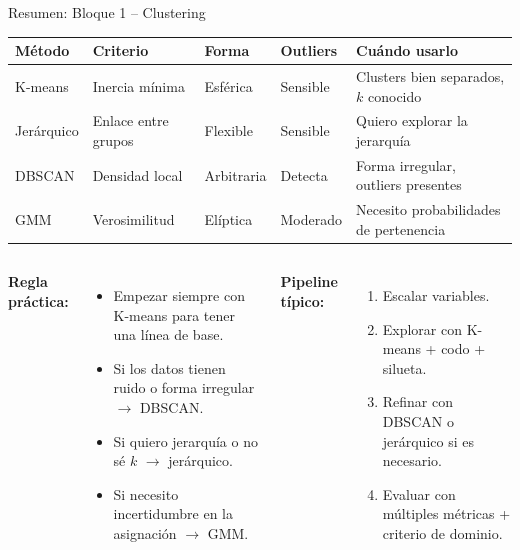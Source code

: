 \documentclass[aspectratio=169]{beamer}
\begin{document}
\begin{frame}{Resumen: Bloque 1 -- Clustering}
\begin{center}
\renewcommand{\arraystretch}{1.4}
{\small
\begin{tabular}{lllll}
\toprule
\textbf{Método} & \textbf{Criterio} & \textbf{Forma} & \textbf{Outliers} & \textbf{Cuándo usarlo} \\
\midrule
K-means    & Inercia mínima    & Esférica   & Sensible & Clusters bien separados, $k$ conocido \\
Jerárquico & Enlace entre grupos & Flexible & Sensible & Quiero explorar la jerarquía \\
DBSCAN     & Densidad local    & Arbitraria & Detecta  & Forma irregular, outliers presentes \\
GMM        & Verosimilitud     & Elíptica   & Moderado & Necesito probabilidades de pertenencia \\
\bottomrule
\end{tabular}
}
\end{center}

\medskip
\begin{columns}[T]
\textbf{Regla práctica:}
\begin{itemize}
  \item Empezar siempre con K-means para tener una línea de base.
  \item Si los datos tienen ruido o forma irregular $\to$ DBSCAN.
  \item Si quiero jerarquía o no sé $k$ $\to$ jerárquico.
  \item Si necesito incertidumbre en la asignación $\to$ GMM.
\end{itemize}

\textbf{Pipeline típico:}
\begin{enumerate}
  \item Escalar variables.
  \item Explorar con K-means + codo + silueta.
  \item Refinar con DBSCAN o jerárquico si es necesario.
  \item Evaluar con múltiples métricas + criterio de dominio.
\end{enumerate}
\end{columns}
\end{frame}
\end{document}
